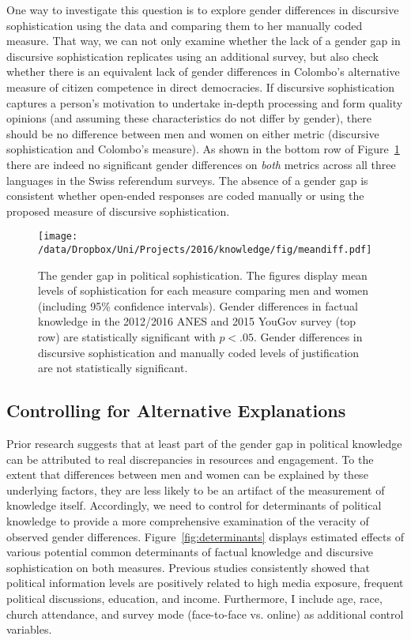 One way to investigate this question is to explore gender differences in discursive sophistication using the \citet{colombo2016justifications} data and comparing them to her manually coded measure. That way, we can not only examine whether the lack of a gender gap in discursive sophistication replicates using an additional survey, but also check whether there is an equivalent lack of gender differences in Colombo's alternative measure of citizen competence in direct democracies. If discursive sophistication captures a person's motivation to undertake in-depth processing and form quality opinions (and assuming these characteristics do not differ by gender), there should be no difference between men and women on either metric (discursive sophistication and Colombo's measure).  As shown in the bottom row of Figure~\ref{fig:meandiff} there are indeed no significant gender differences on \textit{both} metrics across all three languages in the Swiss referendum surveys. The absence of a gender gap is consistent whether open-ended responses are coded manually or using the proposed measure of discursive sophistication.

\begin{figure}[h]\centering
\texttt{[image: /data/Dropbox/Uni/Projects/2016/knowledge/fig/meandiff.pdf]}
\caption{The gender gap in political sophistication. The figures display mean levels of sophistication for each measure comparing men and women (including 95\% confidence intervals). Gender differences in factual knowledge in the 2012/2016 ANES and 2015 YouGov survey (top row) are statistically significant with $p<.05$. Gender differences in discursive sophistication and manually coded levels of justification \citep{colombo2016justifications} are not statistically significant.}\label{fig:meandiff}
\end{figure}


\subsection{Controlling for Alternative Explanations}
Prior research suggests that at least part of the gender gap in political knowledge can be attributed to real discrepancies in resources and engagement. To the extent that differences between men and women can be explained by these underlying factors, they are less likely to be an artifact of the measurement of knowledge itself. Accordingly, we need to control for determinants of political knowledge to provide a more comprehensive examination of the veracity of observed gender differences. Figure~\ref{fig:determinants} displays estimated effects of various potential common determinants of factual knowledge and discursive sophistication on both measures. Previous studies consistently showed that political information levels are positively related to high media exposure, frequent political discussions, education, and income. Furthermore, I include age, race, church attendance, and survey mode (face-to-face vs. online) as additional control variables.

